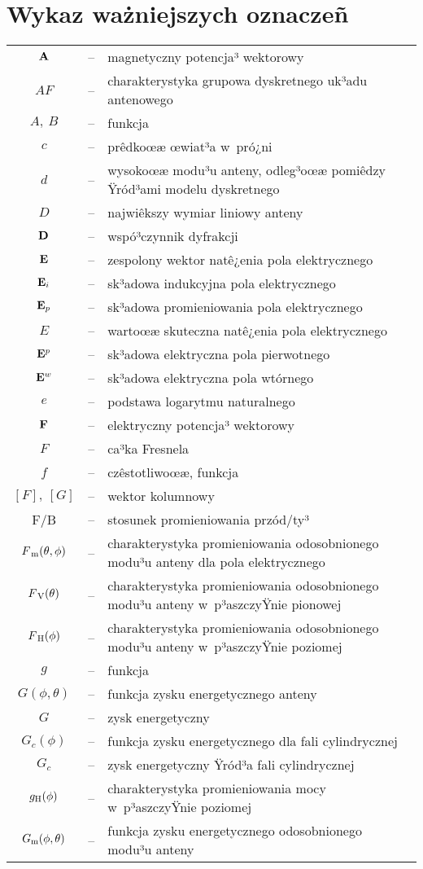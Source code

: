 \chapter*{Wykaz ważniejszych oznaczeñ}
{\small
\begin{tabular}{ccp{10cm}}
  $\bf{A}$ & -- & magnetyczny potencja³ wektorowy\\
  $AF$ & -- & charakterystyka grupowa dyskretnego uk³adu antenowego\\
  $A,~B$ & -- & funkcja\\
  $c$ & -- & prêdkoœæ œwiat³a w~pró¿ni\\
  $d$ & -- & wysokoœæ modu³u anteny, odleg³oœæ pomiêdzy Ÿród³ami modelu dyskretnego\\
  $D$ & -- & najwiêkszy wymiar liniowy anteny\\
  $\bf{D}$ & -- & wspó³czynnik dyfrakcji\\
  ${\bf E}$ & -- & zespolony wektor natê¿enia pola elektrycznego\\
  ${\bf E}_i$ & -- & sk³adowa indukcyjna pola elektrycznego\\
  ${\bf E}_p$ & -- & sk³adowa promieniowania pola elektrycznego\\
  $E$ & -- & wartoœæ skuteczna natê¿enia pola elektrycznego\\
  ${\bf E}^p$ & -- & sk³adowa elektryczna pola pierwotnego\\
  ${\bf E}^w$ & -- & sk³adowa elektryczna pola wtórnego\\
  $e$ & -- & podstawa logarytmu naturalnego \\
  $\bf{F}$ & -- & elektryczny potencja³ wektorowy\\
  $F$ & -- & ca³ka Fresnela\\
  $f$ & -- & czêstotliwoœæ, funkcja\\
  $[F],~[G]$ & -- & wektor kolumnowy\\
  F/B & -- & stosunek promieniowania przód/ty³\\
  $F_{\: \rm m}(\theta,\phi)$ & -- &
  charakterystyka promieniowania odosobnionego modu³u
  anteny dla pola elektrycznego\\
  $F_{\: \rm V}(\theta)$ & -- &
  charakterystyka promieniowania odosobnionego modu³u
  anteny w~p³a\-szczy\-Ÿnie pionowej\\
  $F_{\: \rm H}(\phi)$ & -- &
  charakterystyka promieniowania odosobnionego modu³u
  anteny w~p³a\-szczy\-Ÿnie poziomej\\
  $g$ & -- & funkcja\\
  $G(\phi, \theta)$ & -- & funkcja zysku energetycznego anteny\\
  $G$ & -- & zysk energetyczny\\
  $G_c(\phi)$ & -- & funkcja zysku energetycznego dla fali cylindrycznej\\
  $G_c$ & -- & zysk energetyczny Ÿród³a fali cylindrycznej\\
  $g_{\rm H}(\phi)$ & -- & charakterystyka promieniowania mocy w~p³a\-szczy\-Ÿnie poziomej\\
  $G_{\rm m}(\phi, \theta)$ & -- & funkcja zysku energetycznego odosobnionego modu³u anteny
      \end{tabular}
} \newpage  \thispagestyle{empty}
